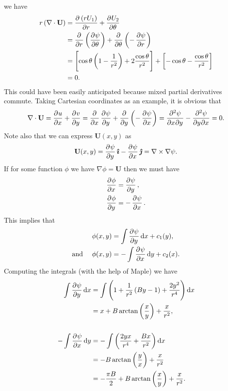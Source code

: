 \documentclass{article}
\def\*#1{\mathbf{#1}}
\newcommand{\ihat}{\boldsymbol{\hat{\imath}}}
\newcommand{\jhat}{\boldsymbol{\hat{\jmath}}}
\begin{document}
%
we have
%
\begin{align*}
    r \del{\nabla \cdot \*U}
        &= \dpd{\del{r U_1}}{r} + \dpd{U_2}{\theta} \\
        &= \dpd{}{r} \del{\dpd{\psi}{\theta}} +  \dpd{}{\theta} \del{- \dpd{\psi}{r}} \\
        &= \sbr{\cos \theta \del{1 - \frac{1}{r^2}} + 2 \frac{\cos \theta}{r^2}}
           + \sbr{-\cos \theta - \frac{\cos \theta}{r^2}} \\
        &= 0
        .
\end{align*}
%
This could have been easily anticipated because mixed partial
derivatives commute. Taking Cartesian coordinates as an example, it is
obvious that
%
\begin{equation*}
    \nabla \cdot \*U = \dpd{u}{x} + \dpd{v}{y}
                     = \dpd{}{x} \dpd{\psi}{y} + \dpd{}{y} \del{- \dpd{\psi}{x}}
                     = \dmd{\psi}{2}{x}{}{y}{} - \dmd{\psi}{2}{y}{}{x}{}
                     = 0
    .
\end{equation*}
%
Note also that we can express $\*U(x, y)$ as
%
\begin{equation*}
    \*U(x, y) = \dpd{\psi}{y} \ihat - \dpd{\psi}{x} \jhat = \nabla \times \nabla \psi
    .
\end{equation*}
%
If for some function $\phi$ we have $\nabla \phi = \*U$ then we must
have
%
\begin{align*}
    \dpd{\phi}{x} &= \dpd{\psi}{y}, \\
    \dpd{\phi}{y} &= - \dpd{\psi}{x}.
\end{align*}
%
This implies that
%
\begin{align*}
    \phi(x, y) &= \int \dpd{\psi}{y} \dif x + c_1(y), \\
    \text{and } \quad \phi(x, y) &= - \int \dpd{\psi}{x} \dif y + c_2(x).
\end{align*}
%
Computing the integrals (with the help of Maple) we have
%
\begin{align*}
    \int \dpd{\psi}{y} \dif x
        &= \int
            \del{
            1
            + \frac{1}{r^2} \del{B y - 1}
            + \frac{2 y^2}{r^4}
            }
           \dif x \\
        &= x + B \arctan \del{\frac{x}{y}} + \frac{x}{r^2}, \\ \\
    - \int \dpd{\psi}{x} \dif y
        &= - \int
            \del{
            \frac{2 y x}{r^4}
            + \frac{B x}{r^2}
            }
           \dif x \\
        &=  - B \arctan \del{\frac{y}{x}} + \frac{x}{r^2} \\
        &=  - \frac{\pi B}{2} + B \arctan \del{\frac{x}{y}} + \frac{x}{r^2}
        .
\end{align*}
\end{document}

